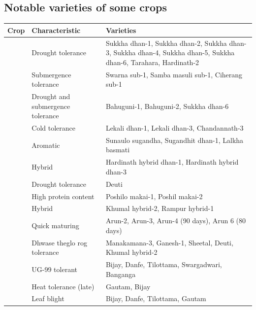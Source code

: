 \documentclass[
  openany]{book}
\begin{document}
\hypertarget{notable-varieties-of-some-crops}{%
\subsection{Notable varieties of some crops}\label{notable-varieties-of-some-crops}}

\begingroup\fontsize{8}{10}\selectfont

\begin{longtable}{>{\raggedright\arraybackslash}p{8em}>{\raggedright\arraybackslash}p{10em}>{\raggedright\arraybackslash}p{24em}}
\toprule
Crop & Characteristic & Varieties\\
\midrule
\rowcolor{gray!6}   & Drought tolerance & Sukkha dhan-1, Sukkha dhan-2, Sukkha dhan-3, Sukkha dhan-4, Sukkha dhan-5, Sukkha dhan-6, Tarahara, Hardinath-2\\
\cmidrule{2-3}
 & Submergence tolerance & Swarna sub-1, Samba masuli sub-1, Ciherang sub-1\\
\cmidrule{2-3}
\rowcolor{gray!6}   & Drought and submergence tolerance & Bahuguni-1, Bahuguni-2, Sukkha dhan-6\\
\cmidrule{2-3}
 & Cold tolerance & Lekali dhan-1, Lekali dhan-3, Chandannath-3\\
\cmidrule{2-3}
\rowcolor{gray!6}   & Aromatic & Sunaulo sugandha, Sugandhit dhan-1, Lalkha basmati\\
\cmidrule{2-3}
\multirow{-6}{*}{\raggedright\arraybackslash Rice} & Hybrid & Hardinath hybrid dhan-1, Hardinath hybrid dhan-3\\
\cmidrule{1-3}
\rowcolor{gray!6}   & Drought tolerance & Deuti\\
\cmidrule{2-3}
 & High protein content & Poshilo makai-1, Poshil makai-2\\
\cmidrule{2-3}
\rowcolor{gray!6}   & Hybrid & Khumal hybrid-2, Rampur hybrid-1\\
\cmidrule{2-3}
 & Quick maturing & Arun-2, Arun-3, Arun-4 (90 days), Arun 6 (80 days)\\
\cmidrule{2-3}
\rowcolor{gray!6}  \multirow{-5}{*}{\raggedright\arraybackslash Maize} & Dhwase theglo rog tolerance & Manakamana-3, Ganesh-1, Sheetal, Deuti, Khumal hybrid-2\\
\cmidrule{1-3}
 & UG-99 tolerant & Bijay, Danfe, Tilottama, Swargadwari, Banganga\\
\cmidrule{2-3}
\rowcolor{gray!6}   & Heat tolerance (late) & Gautam, Bijay\\
\cmidrule{2-3}
 & Leaf blight & Bijay, Danfe, Tilottama, Gautam\\

\end{longtable}
\end{document}
